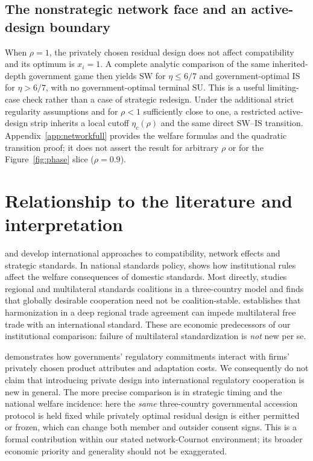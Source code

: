 \documentclass[11pt,a4paper]{article}
\theoremstyle{remark}\newtheorem{remark}[theorem]{Remark}
\newcommand{\SW}{\mathrm{SW}}\newcommand{\SU}{\mathrm{SU}}\newcommand{\IS}{\mathrm{IS}}
\begin{document}
\subsection{The nonstrategic network face and an active-design boundary}
When $\rho=1$, the privately chosen residual design does not affect compatibility and its optimum is $x_i=1$. A complete analytic comparison of the same inherited-depth government game then yields $\SW$ for $\eta\le6/7$ and government-optimal $\IS$ for $\eta>6/7$, with no government-optimal terminal $\SU$. This is a useful limiting-case check rather than a case of strategic redesign. Under the additional strict regularity assumptions and for $\rho<1$ sufficiently close to one, a restricted active-design strip inherits a local cutoff $\eta_c(\rho)$ and the same direct $\SW$--$\IS$ transition. Appendix~\ref{app:networkfull} provides the welfare formulas and the quadratic transition proof; it does not assert the result for arbitrary $\rho$ or for the Figure~\ref{fig:phase} slice ($\rho=0.9$).

\section{Relationship to the literature and interpretation}\label{sec:literature}
\citet{GandalShy2001} and \citet{Klimenko2009} develop international approaches to compatibility, network effects and strategic standards. In national standards policy, \citet{Costinot2008} shows how institutional rules affect the welfare consequences of domestic standards. Most directly, \citet{Takarada2020} studies regional and multilateral standards coalitions in a three-country model and finds that globally desirable cooperation need not be coalition-stable. \citet{Kawabata2021} establishes that harmonization in a deep regional trade agreement can impede multilateral free trade with an international standard. These are economic predecessors of our institutional comparison: failure of multilateral standardization is \emph{not} new per se.

\citet{Grossman2021} demonstrates how governments' regulatory commitments interact with firms' privately chosen product attributes and adaptation costs. We consequently do not claim that introducing private design into international regulatory cooperation is new in general. The more precise comparison is in strategic timing and the national welfare incidence: here the \emph{same} three-country governmental accession protocol is held fixed while privately optimal residual design is either permitted or frozen, which can change both member and outsider consent signs. This is a formal contribution within our stated network-Cournot environment; its broader economic priority and generality should not be exaggerated.
\end{document}
